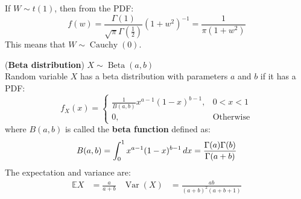 \documentclass{huhtakm-template-book}
\newcommand{\expect}{\mathbb{E}}
\DeclareMathOperator{\Cauchy}{Cauchy}
\DeclareMathOperator{\Beta}{Beta}
\DeclareMathOperator{\Var}{Var}
\begin{document}
\begin{rem}
	If $W\sim t(1)$, then from the PDF:
	\begin{equation*}
		f(w)=\frac{\Gamma(1)}{\sqrt{\pi}\Gamma\left(\frac{1}{2}\right)}(1+w^{2})^{-1}=\frac{1}{\pi(1+w^{2})}
	\end{equation*}
	This means that $W\sim\Cauchy(0)$.
\end{rem}

\begin{eg}(\textbf{Beta distribution}) $X\sim\Beta(a,b)$\\
	Random variable $X$ has a beta distribution with parameters $a$ and $b$ if it has a PDF:
	\begin{equation*}
		f_{X}(x)=\begin{cases}
			\frac{1}{B(a,b)}x^{a-1}(1-x)^{b-1}, &0<x<1\\
			0, &\text{Otherwise}
		\end{cases}
	\end{equation*}
	where $B(a,b)$ is called the \textbf{beta function} defined as:
	\begin{equation*}
		B(a,b)=\int_{0}^{1}x^{a-1}(1-x)^{b-1}\,dx=\frac{\Gamma(a)\Gamma(b)}{\Gamma(a+b)}
	\end{equation*}
	The expectation and variance are:
	\begin{align*}
		\expect{X}&=\frac{a}{a+b} & \Var(X)&=\frac{ab}{(a+b)^{2}(a+b+1)}
	\end{align*}
\end{eg}


\newpage
\end{document}
